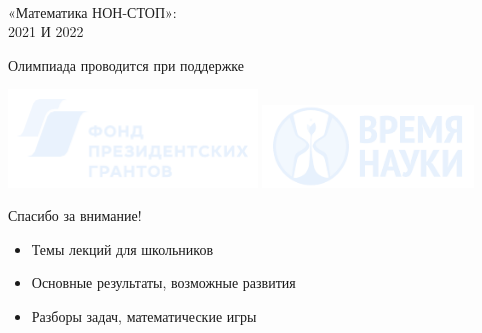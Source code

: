 \documentclass[17pt]{extarticle}
\newcommand{\newslide}[1]{\newpage \begin{center} \large #1 \end{center}}
\begin{document}
\ \\ [1cm]

\begin{center} \Large «Математика НОН-СТОП»:\medskip \\ 2021 И 2022 \end{center}

\newslide{Олимпиада проводится при поддержке}

\begin{center}
	\includegraphics[height=2.6cm]{fig/fpg}\quad
	\includegraphics[height=2.2cm]{fig/vn}
\end{center}



\newpage \begin{center} \Large Спасибо за внимание! \end{center}

\begin{itemize}
	\item Темы лекций для школьников
	\item Основные результаты, возможные развития
	\item Разборы задач, математические игры
\end{itemize}
\end{document}
